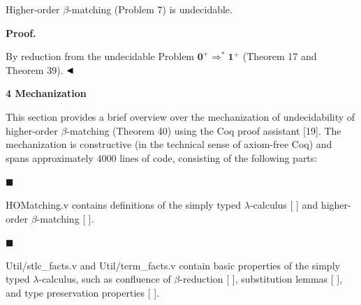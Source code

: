  
Higher-order $\beta$-matching (Problem 7) is undecidable.\par
 
 
 
 
 
\par\medskip\noindent\textbf{Proof.}\par
 
 
By reduction from the undecidable Problem $\mathbf{0}^{+}\Rightarrow^{*}\mathbf{1}^{+}$ (Theorem 17 and Theorem 39). $\hfill\blacktriangleleft$\par
 
 
 
 


 
\par\medskip\noindent\textbf{4 Mechanization}\par
 
 
This section provides a brief overview over the mechanization of undecidability of higher-order $\beta$-matching (Theorem 40) using the Coq proof assistant [19]. The mechanization is constructive (in the technical sense of axiom-free Coq) and spans approximately $4000$ lines of code, consisting of the following parts:\par
  
\par\noindent  $\blacksquare$ 
 
HOMatching.v contains definitions of the simply typed $\lambda$-calculus [ ] and higher-order $\beta$-matching [ ].\par
 
 
 
\par\noindent  $\blacksquare$ 
 
Util/stlc\_facts.v and Util/term\_facts.v contain basic properties of the simply typed $\lambda$-calculus, such as confluence of $\beta$-reduction [ ], substitution lemmas [ ], and type preservation properties [ ].\par
 
